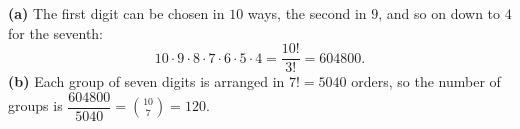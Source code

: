 \textbf{(a)} The first digit can be chosen in $10$ ways, the second in $9$, and so on down to $4$ for the seventh:
\[
10\cdot9\cdot8\cdot7\cdot6\cdot5\cdot4=\dfrac{10!}{3!}=\boxed{604800}.
\]
\textbf{(b)} Each group of seven digits is arranged in $7!=5040$ orders, so the number of groups is $\dfrac{604800}{5040}=\binom{10}{7}=\boxed{120}$.
